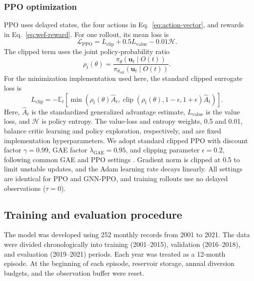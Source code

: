 \documentclass [a4paper,fleqn] {cas-dc}
\begin{document}
\subsubsection{PPO optimization}
\label{sec323}

PPO uses delayed states, the four actions in Eq.~\ref{eq:action-vector}, and rewards in Eq.~\ref{eq:wef-reward}. For one rollout, its mean loss is
\begin{equation}
  \mathcal L_{\mathrm{PPO}}=L_{\mathrm{clip}}
  +0.5L_{\mathrm{value}}-0.01\mathcal H.
  \label{eq:ppo-objective}
\end{equation}
The clipped term uses the joint policy-probability ratio
\begin{equation}
  \rho_t(\theta)=
  \frac{\pi_\theta\!\left(\mathbf u_t\mid O(t)\right)}
       {\pi_{\theta_{\mathrm{old}}}\!\left(\mathbf u_t\mid O(t)\right)}.
  \label{eq:ppo-ratio}
\end{equation}
For the minimization implementation used here, the standard clipped surrogate loss is
\begin{equation}
  L_{\mathrm{clip}}=
  -\mathbb E_t\!\left[
  \min\!\left(
  \rho_t(\theta)\hat A_t,
  \operatorname{clip}\!\left(\rho_t(\theta),1-\epsilon,1+\epsilon\right)
  \hat A_t
  \right)\right].
  \label{eq:ppo-clipped-surrogate}
\end{equation}
Here, $\hat A_t$ is the standardized generalized advantage estimate, $L_{\mathrm{value}}$ is the value loss, and $\mathcal H$ is policy entropy. The value-loss and entropy weights, 0.5 and 0.01, balance critic learning and policy exploration, respectively, and are fixed implementation hyperparameters. We adopt standard clipped PPO with discount factor $\gamma=0.99$, GAE factor $\lambda_{\mathrm{GAE}}=0.95$, and clipping parameter $\epsilon=0.2$, following common GAE and PPO settings \citep{schulman2016gae,schulman2017ppo}. Gradient norm is clipped at 0.5 to limit unstable updates, and the Adam learning rate decays linearly. All settings are identical for PPO and GNN-PPO, and training rollouts use no delayed observations ($\tau=0$).

\subsection{Training and evaluation procedure}
\label{sec33}

The model was developed using 252 monthly records from 2001 to 2021. The data were divided chronologically into training (2001--2015), validation (2016--2018), and evaluation (2019--2021) periods. Each year was treated as a 12-month episode. At the beginning of each episode, reservoir storage, annual diversion budgets, and the observation buffer were reset.
\end{document}
